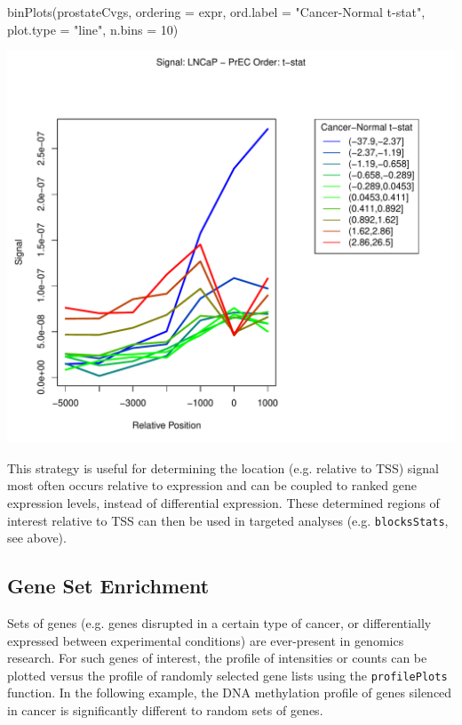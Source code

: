 \begin{Schunk}
\begin{Sinput}
 binPlots(prostateCvgs, ordering = expr, ord.label = "Cancer-Normal t-stat", 
     plot.type = "line", n.bins = 10)
\end{Sinput}
\end{Schunk}
\includegraphics{visualisations-binPlotsLine}

This strategy is useful for determining the location (e.g. relative to TSS) signal most often occurs relative to expression and can be coupled to ranked gene expression levels, instead of differential expression.  These determined regions of interest relative to TSS can then be used in targeted analyses (e.g. \texttt{blocksStats}, see above).

\subsection{Gene Set Enrichment}

Sets of genes (e.g. genes disrupted in a certain type of cancer, or differentially expressed between experimental conditions) are ever-present in genomics research.  For such genes of interest, the profile of intensities or counts can be plotted versus the profile of randomly selected gene lists using the \texttt{profilePlots} function. In the following example, the DNA methylation profile of genes silenced in cancer is significantly different to random sets of genes.

